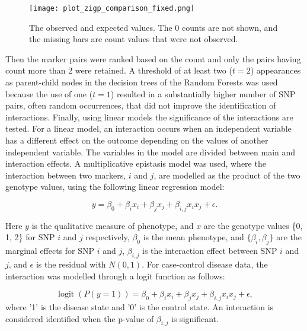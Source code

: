 \documentclass[preprint,12pt,3p]{elsarticle}
\DeclareMathOperator{\logit}{\textrm{logit}}
\begin{document}
\begin{figure}[thbp]
  \begin{center}
    \centering
    \texttt{[image: plot\_zigp\_comparison\_fixed.png]}
    \caption{The observed and expected values. The 0 counts are not shown, and the missing bars are count values that
      were not observed.}
    \label{figure:plot_zigp_comparison_fixed.png} 
  \end{center}
\end{figure}

Then the marker pairs were ranked based on the count and only the pairs having count
more than 2 were retained. A threshold of at least two ($t = 2$) appearances as parent-child nodes in the decision trees
of the Random Forests was used because the use of one ($t = 1$) resulted in a substantially higher number of SNP pairs,
often random occurrences, that did not improve the identification of interactions.  Finally, using linear models the
significance of the interactions are tested. For a linear model, an interaction occurs when an independent variable has
a different effect on the outcome depending on the values of another independent variable. The variables in the model
are divided between main and interaction effects. A multiplicative epistasis model was used, where the interaction
between two markers, $i$ and $j$, are modelled as the product of the two genotype values, using the following linear
regression model:

\begin{equation}
  y = \beta_0 + \beta_i x_i +  \beta_j x_j + \beta_{i,j} x_ix_j + \epsilon.
  \label{eqn:linearmmodel}
\end{equation}

Here $y$ is the qualitative measure of phenotype, and $x$ are the genotype values \{0, 1, 2\}  for SNP $i$ and $j$ respectively,
$\beta_0$ is the mean phenotype, and  $\{\beta_i, \beta_j\}$ are the marginal effects for SNP $i$ and $j$, $\beta_{i,j}$
is the interaction effect between SNP $i$  and  $j$, and $\epsilon$ is the residual with $N(0,1)$. For case-control disease data, the interaction was modelled
through a logit function as follows:

\begin{equation}
  \logit (P(y =1)) =  \beta_0 + \beta_i x_i +  \beta_j x_j + \beta_{i,j} x_ix_j + \epsilon,
  \label{eqn:logitmodel}
\end{equation}
where '1' is the disease state and '0' is the control state.  An interaction is considered identified when the p-value of $\beta_{i,j}$ is significant.
\end{document}
